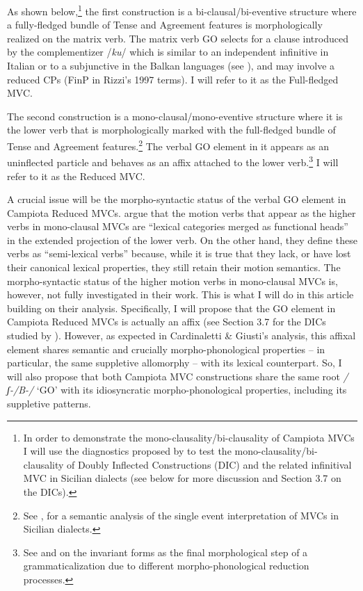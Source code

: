 \documentclass[output=paper]{langscibook}
\begin{document}
As shown below,\footnote{In order to demonstrate the mono-clausality/bi-clausality of Campiota MVCs I will use the diagnostics proposed by \citet{cardinaletti2003a} to test the mono-clausality/bi-clausality of Doubly Inflected Constructions (DIC) and the related infinitival MVC in Sicilian dialects (see below for more discussion and Section 3.7 on the DICs).}  the first construction is a bi-clausal/bi-eventive structure where a fully-fledged bundle of Tense and Agreement features is morphologically realized on the matrix verb. The matrix verb GO selects for a clause introduced by the complementizer /\textit{ku}/ which is similar to an independent infinitive in Italian or to a subjunctive in the Balkan languages (see \citealt{calabrese1993a}), and may involve a reduced CPs (FinP in Rizzi’s 1997 terms).  I will refer to it as the Full-fledged MVC.

The second construction is a mono-clausal/mono-eventive structure where it is the lower verb that is morphologically marked with the full-fledged bundle of Tense and Agreement features.\footnote{See \citet{prete2020a}, \citet{todaro2018a} for a semantic analysis of the single event interpretation of MVCs in Sicilian dialects.}  The verbal GO element in it appears as an uninflected particle and behaves as an affix attached to the lower verb.\footnote{See \citet{cruschina2013a, cruschina2021a} and \citet{ledgeway2016a} on the invariant forms as the final morphological step of a grammaticalization due to different morpho-phonological reduction processes.}  I will refer to it as the Reduced MVC.

A crucial issue will be the morpho-syntactic status of the verbal GO element in Campiota Reduced MVCs. \citet{cardinaletti2003a} argue that the motion verbs that appear as the higher verbs in mono-clausal MVCs are “lexical categories merged as functional heads” in the extended projection of the lower verb. On the other hand, they define these verbs as “semi-lexical verbs” because, while it is true that they lack, or have lost their canonical lexical properties, they still retain their motion semantics. The morpho-syntactic status of the higher motion verbs in mono-clausal MVCs is, however, not fully investigated in their work.  This is what I will do in this article building on their analysis.  Specifically, I will propose that the GO element in Campiota Reduced MVCs is actually an affix (see Section 3.7 for the DICs studied by \citet{cardinaletti2003a}). However, as expected in Cardinaletti \& Giusti’s analysis, this affixal element shares semantic and crucially morpho-phonological properties -- in particular, the same suppletive allomorphy --  with its lexical counterpart.  So, I will also propose that both Campiota MVC constructions share the same root \textit{/ʃ-/B-/} ‘GO’ with its idiosyncratic morpho-phonological properties, including its suppletive patterns.
\end{document}
